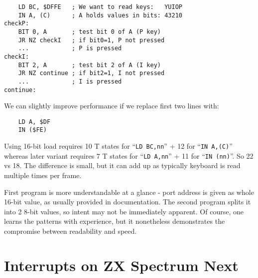 \documentclass[12pt,twoside,openright,a4paper]{book}
\begin{document}
\begin{lstlisting}
	LD BC, $DFFE   ; We want to read keys:   YUIOP
	IN A, (C)      ; A holds values in bits: 43210
checkP:
	BIT 0, A       ; test bit 0 of A (P key)
	JR NZ checkI   ; if bit0=1, P not pressed
	...            ; P is pressed
checkI:
	BIT 2, A       ; test bit 2 of A (I key)
	JR NZ continue ; if bit2=1, I not pressed
	...            ; I is pressed
continue:
\end{lstlisting}

We can slightly improve performance if we replace first two lines with:

\begin{lstlisting}
	LD A, $DF
	IN ($FE)
\end{lstlisting}

Using 16-bit load requires 10 T states for ``{\tt LD BC,nn}'' + 12 for ``{\tt IN A,(C)}'' whereas later variant requires 7 T states for ``{\tt LD A,nn}'' + 11 for ``{\tt IN (nn)}''. So 22 vs 18. The difference is small, but it can add up as typically keyboard is read multiple times per frame.

First program is more understandable at a glance - port address is given as whole 16-bit value, as usually provided in documentation. The second program splits it into 2 8-bit values, so intent may not be immediately apparent. Of course, one learns the patterns with experience, but it nonetheless demonstrates the compromise between readability and speed.



\pagebreak
\section{Interrupts on ZX Spectrum Next}
\label{zx_next_interrupts}

\end{document}
